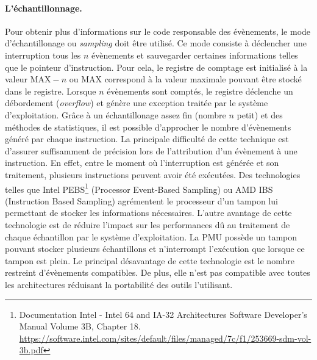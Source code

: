         \paragraph{L'échantillonnage.} Pour obtenir plus d'informations sur le code responsable des évènements, le mode d'échantillonage ou \textit{sampling} doit être utilisé. Ce mode consiste à déclencher une interruption tous les $n$ évènements et sauvegarder certaines informations telles que le pointeur d'instruction. Pour cela, le registre de comptage est initialisé à la valeur $\text{MAX} - n$ ou $\text{MAX}$ correspond à la valeur maximale pouvant être stocké dans le registre. Lorsque $n$ évènements sont comptés, le registre déclenche un débordement (\textit{overflow}) et génère une exception traitée par le système d'exploitation. Grâce à un échantillonage assez fin (nombre $n$ petit) et des méthodes de statistiques, il est possible d'approcher le nombre d'évènements généré par chaque instruction. La principale difficulté de cette technique est d'assurer suffisamment de précision lors de l'attribution d'un évènement à une instruction. En effet, entre le moment où l'interruption est générée et son traitement, plusieurs instructions peuvent avoir été exécutées. Des technologies telles que Intel PEBS\footnote{Documentation Intel - Intel 64 and IA-32 Architectures Software Developer's Manual Volume 3B, Chapter 18. \url{https://software.intel.com/sites/default/files/managed/7c/f1/253669-sdm-vol-3b.pdf}} (Processor Event-Based Sampling) ou AMD IBS (Instruction Based Sampling) \cite{Drongowski2007} agrémentent le processeur d'un tampon lui permettant de stocker les informations nécessaires. L'autre avantage de cette technologie est de réduire l'impact sur les performances dû au traitement de chaque échantillon par le système d'exploitation. La PMU possède un tampon pouvant stocker plusieurs échantillons et n'interrompt l'exécution que lorsque ce tampon est plein. Le principal désavantage de cette technologie est le nombre restreint d'évènements compatibles. De plus, elle n'est pas compatible avec toutes les architectures réduisant la portabilité des outils l'utilisant.
   
